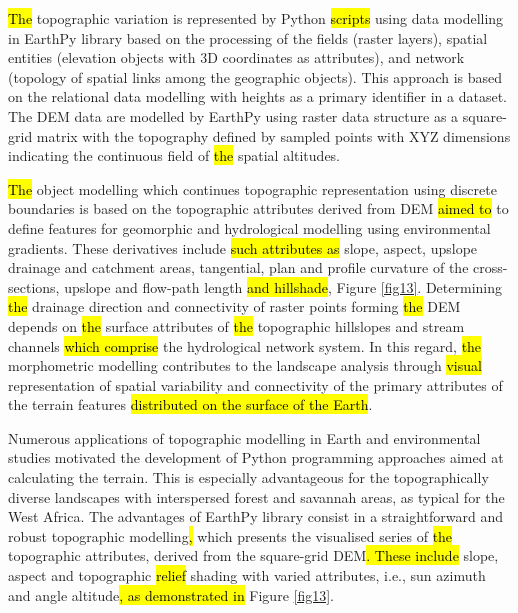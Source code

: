 \documentclass[jimaging,article,submit,pdftex,moreauthors]{Definitions/mdpi}
\begin{document}
\hl{The }topographic variation is represented by Python \hl{scripts} using data modelling in EarthPy library based on the processing of the fields (raster layers), spatial entities (elevation objects with 3D coordinates as attributes), and network (topology of spatial links among the geographic objects). This approach is based on the relational data modelling with heights as a primary identifier in a dataset. The DEM data are modelled by EarthPy using raster data structure as a square-grid matrix with the topography defined by\hl{ }sampled points with XYZ dimensions indicating the continuous field of \hl{the} spatial altitudes. 

\hl{The }object modelling which continues topographic representation using discrete boundaries is based on the topographic attributes derived from DEM \hl{aimed to} to define features for geomorphic and hydrological modelling using environmental gradients. These derivatives include \hl{such attributes as} slope, aspect, upslope drainage and catchment areas, tangential, plan and profile curvature of the cross-sections, upslope and flow-path length\hl{ and hillshade}, Figure \ref{fig13}. Determining \hl{the} drainage direction and connectivity of raster points forming \hl{the} DEM depends on \hl{the} surface attributes of \hl{the} topographic hillslopes and stream channels \hl{which comprise} the hydrological network system. In this regard, \hl{the} morphometric modelling contributes to the landscape analysis through \hl{visual} representation of spatial variability and connectivity of the primary attributes of the terrain features \hl{distributed on the surface of the Earth}. 

Numerous applications of topographic modelling in Earth and environmental studies motivated the development of\hl{ }Python programming approaches aimed at calculating the terrain. This is especially advantageous for the topographically diverse landscapes with interspersed forest and savannah areas, as typical for the West Africa. The advantages of EarthPy library consist in a straightforward and robust topographic modelling\hl{, }which presents the visualised series of \hl{the} topographic attributes, derived from the square-grid DEM\hl{. These include} slope, aspect and topographic \hl{relief} shading with varied attributes, i.e., sun azimuth and angle altitude\hl{, as demonstrated in} Figure \ref{fig13}.
\end{document}

